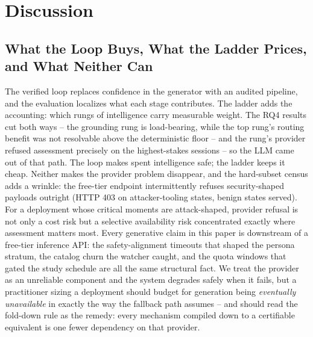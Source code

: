 \section{Discussion}
\label{sec:discussion}

\subsection{What the Loop Buys, What the Ladder Prices, and What Neither Can}
The verified loop replaces confidence in the generator with an audited
pipeline, and the evaluation localizes what each stage
contributes. The ladder adds the accounting: which rungs of intelligence
carry measurable weight. The RQ4 results cut both ways -- the
grounding rung is load-bearing, while the top rung's routing benefit
was not resolvable above the deterministic floor -- and the rung's
provider refused assessment precisely on the highest-stakes sessions --
so the LLM came out of that path. The loop makes spent intelligence
safe; the ladder keeps it cheap. Neither makes the provider problem
disappear, and the hard-subset census adds a wrinkle: the free-tier
endpoint intermittently refuses security-shaped payloads outright
(HTTP 403 on attacker-tooling states, benign states served). For a
deployment whose critical moments are attack-shaped, provider refusal
is not only a cost risk but a selective availability risk concentrated
exactly where assessment matters most. Every
generative claim in this paper is downstream of a free-tier inference
API: the safety-alignment timeouts that shaped the persona stratum, the
catalog churn the watcher caught, and the quota windows that gated the
study schedule are all the same structural fact. We treat the provider as
an unreliable component and the system degrades safely when it fails, but
a practitioner sizing a deployment should budget for generation being
\emph{eventually unavailable} in exactly the way the fallback path
assumes -- and should read the fold-down rule as the remedy: every
mechanism compiled down to a certifiable equivalent is one fewer
dependency on that provider.

